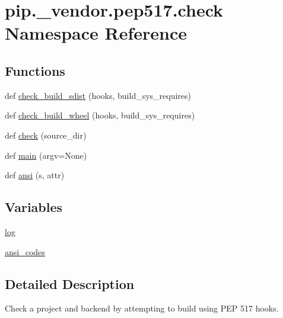 \hypertarget{namespacepip_1_1__vendor_1_1pep517_1_1check}{}\section{pip.\+\_\+vendor.\+pep517.\+check Namespace Reference}
\label{namespacepip_1_1__vendor_1_1pep517_1_1check}
\subsection*{Functions}
\begin{DoxyCompactItemize}
\item 
def \hyperlink{namespacepip_1_1__vendor_1_1pep517_1_1check_a3a47dab668d25537ec30491d2e22e56c}{check\+\_\+build\+\_\+sdist} (hooks, build\+\_\+sys\+\_\+requires)
\item 
def \hyperlink{namespacepip_1_1__vendor_1_1pep517_1_1check_a7b1f730ec661149c95e01df2ba63d97b}{check\+\_\+build\+\_\+wheel} (hooks, build\+\_\+sys\+\_\+requires)
\item 
def \hyperlink{namespacepip_1_1__vendor_1_1pep517_1_1check_aa7d239907a676c2dc0540724660f94b7}{check} (source\+\_\+dir)
\item 
def \hyperlink{namespacepip_1_1__vendor_1_1pep517_1_1check_a9cfcc93eef450855d2d5e6f6b1ba7721}{main} (argv=None)
\item 
def \hyperlink{namespacepip_1_1__vendor_1_1pep517_1_1check_aa7c83fcc7edc7efae9c474df149dae30}{ansi} (s, attr)
\end{DoxyCompactItemize}
\subsection*{Variables}
\begin{DoxyCompactItemize}
\item 
\hyperlink{namespacepip_1_1__vendor_1_1pep517_1_1check_a3d2c5dd21f75e60c8f924d002bfc0434}{log}
\item 
\hyperlink{namespacepip_1_1__vendor_1_1pep517_1_1check_acbb6214cf5cb451cf5a0bd873d536331}{ansi\+\_\+codes}
\end{DoxyCompactItemize}


\subsection{Detailed Description}
\begin{DoxyVerb}Check a project and backend by attempting to build using PEP 517 hooks.
\end{DoxyVerb}
 

